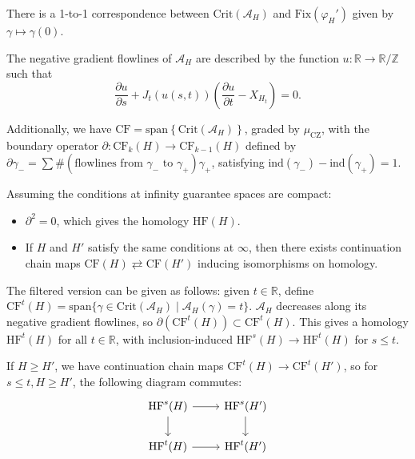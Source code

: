 There is a 1-to-1 correspondence between $\text{Crit}(\mathcal{A}_H)$ and $\text{Fix}(\varphi_H')$ given by $\gamma \mapsto \gamma(0)$.

The negative gradient flowlines of $\mathcal{A}_H$ are described by the function $u: \mathbb{R}\to \mathbb{R}/\mathbb{Z}$ such that
\[
\dfrac{\partial u}{\partial s}+J_t(u(s,t)) \left( \dfrac{\partial u}{\partial t}- X_{H_t} \right)=0.
\]

Additionally, we have $\text{CF} = \text{span} \left\{ \text{Crit}(\mathcal{A}_H) \right\}$, graded by $\mu_{\text{CZ}}$, with the boundary operator $\partial: \text{CF}_k(H) \to \text{CF}_{k-1}(H)$ defined by $\partial \gamma_- = \sum \# (\text{flowlines from } \gamma_- \text{ to } \gamma_+) \gamma_+$, satisfying $\text{ind}(\gamma_-) - \text{ind}(\gamma_+) = 1$.

\begin{proposition}

Assuming the conditions at infinity guarantee spaces are compact:
\begin{itemize}
\item $\partial^2 =0$, which gives the homology $\text{HF}(H)$.
\item If $H$ and $H'$ satisfy the same conditions at $\infty$, then there exists continuation chain maps $\text{CF}(H)\rightleftarrows \text{CF}(H')$ inducing isomorphisms on homology.
\end{itemize}

\end{proposition}

The filtered version can be given as follows: given $t\in \mathbb{R}$, define $\text{CF}^t(H)= \text{span} \{ \gamma \in \text{Crit}(\mathcal{A}_H) \mid  \mathcal{A}_H(\gamma)=t \}$. $\mathcal{A}_H$ decreases along its negative gradient flowlines, so $\partial(\text{CF}^t(H)) \subset \text{CF}^t(H)$. This gives a homology $\text{HF}^t(H)$ for all $t\in \mathbb{R}$, with inclusion-induced $\text{HF}^s(H)\to \text{HF}^t(H)$ for $s\le t$.

If $H\ge H'$, we have continuation chain maps $\text{CF}^t(H) \to \text{CF}^t(H')$, so for $s\le t, H\ge H'$, the following diagram commutes:
\[
\begin{tikzcd}
	{\text{HF}^s(H)} & {\text{HF}^s(H')} \\
	{\text{HF}^t(H)} & {\text{HF}^t(H')}
	\arrow[from=1-1, to=1-2]
	\arrow[from=1-1, to=2-1]
	\arrow[from=1-2, to=2-2]
	\arrow[from=2-1, to=2-2]
\end{tikzcd}
\]

